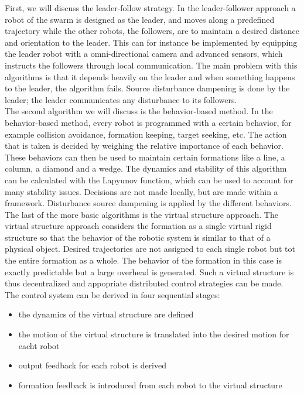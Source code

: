 First, we will discuss the leader-follow strategy. 
In the leader-follower approach a robot of the swarm is designed as the leader, 
and moves along a predefined trajectory while the other robots, the followers, are to maintain a desired distance and orientation to the leader. \cite{Consolini}
This can for instance be implemented by equipping the leader robot with a omni-directional camera and advanced sensors, which instructs the followers through local communication. \cite{Das}
The main problem with this algorithms is that it depends heavily on the leader and when something happens to the leader, the algorithm fails. 
Source disturbance dampening is done by the leader; the leader communicates any disturbance to its followers. \\

The second algorithm we will discuss is the behavior-based method. 
In the behavior-based method, every robot is programmed with a certain behavior, for example collision avoidance, formation keeping, target seeking, etc. 
The action that is taken is decided by weighing the relative importance of each behavior. \cite{consolini}
These behaviors can then be used to maintain certain formations like a line, a column, a diamond and a wedge. \cite{Balch}
The dynamics and stability of this algorithm can be calculated with the Lapyunov function, which can be used to account for many stability issues. \cite{Lawton}
Decisions are not made locally, but are made within a framework.
Disturbance source dampening is applied by the different behaviors. \\

The last of the more basic algorithms is the virtual structure approach. 
The virtual structure approach considers the formation as a single virtual rigid structure so that the behavior of the robotic system is similar to that of a physical object. 
Desired trajectories are not assigned to each single robot but tot the entire formation as a whole. 
The behavior of the formation in this case is exactly predictable but a large overhead is generated. \cite{consolini}
Such a virtual structure is thus decentralized and appopriate distributed control strategies can be made. \cite{Ren}
The control system can be derived in four sequential stages: \cite{Do}
\begin{itemize}
	\item the dynamics of the virtual structure are defined
	\item the motion of the virtual structure is translated into the desired motion for eacht robot
	\item output feedback for each robot is derived
	\item formation feedback is introduced from each robot to the virtual structure
\end{itemize} \\

